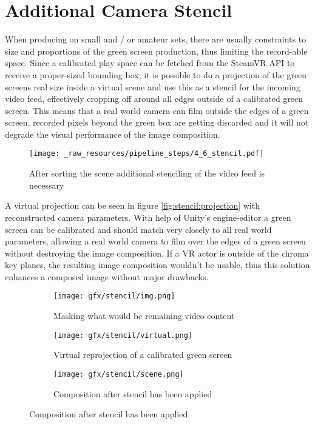 %
\section{Additional Camera Stencil}

When producing on small and / or amateur sets, there are usually constraints to 
size and proportions of the green screen production, thus limiting the 
record-able space. Since a calibrated play space can be fetched from the 
SteamVR API to receive a proper-sized bounding box, it is possible to do a 
projection of the green screens real size inside a virtual scene and use this 
as a stencil for the incoming video feed, effectively cropping off around all 
edges outside of a calibrated green screen. This means that a real world camera 
can film outside the edges of a green screen, recorded pixels beyond the green 
box are getting discarded and it will not degrade the visual performance of the 
image composition.

\begin{figure}[htb]
	\texttt{[image: \_raw\_resources/pipeline\_steps/4\_6\_stencil.pdf]}
	\caption{After sorting the scene additional stenciling of the video feed is 
	necessary}
	\label{fig:steps:stencil}
\end{figure}

A virtual projection can be seen in figure \ref{fig:stencil:projection} with 
reconstructed camera parameters. With help of Unity's engine-editor a 
green screen can be calibrated and should match very closely to all real world 
parameters, allowing a real world camera to film over the edges of a 
green screen without destroying the image composition. If a VR actor is outside 
of the chroma key planes, the resulting image composition wouldn't be usable, 
thus this solution enhances a composed image without major 
drawbacks.

\begin{figure}[htbp]
	\caption{Virtual projection and photo of VR actor - red colored areas will 
	be cut off}
	\label{fig:stencil:projection}
	\begin{subfigure}[t]{.3\textwidth}
		\centering
		\texttt{[image: gfx/stencil/img.png]}
		\caption{Masking what would be remaining video content}
	\end{subfigure}
	\begin{subfigure}[t]{.3\textwidth}
		\centering
		\texttt{[image: gfx/stencil/virtual.png]}
		\caption{Virtual reprojection of a calibrated green screen}
	\end{subfigure}
	\begin{subfigure}[t]{.3\textwidth}
		\centering
		\texttt{[image: gfx/stencil/scene.png]}
		\caption{Composition after stencil has been applied}
	\end{subfigure}
\end{figure}

